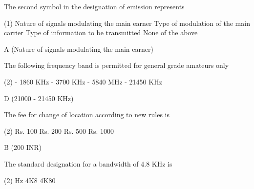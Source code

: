 \documentclass[a4paper]{article}
\begin{document}
\vspace{5mm}



\begin{question}The second symbol in the designation of emission represents
	\begin{tasks}(1)
		\task Nature of signals modulating the main earner
		\task Type of modulation of the main carrier
		\task Type of information to be transmitted
		\task None of the above
	\end{tasks}
\end{question}

\begin{solution}
	A (Nature of signals modulating the main earner)
\end{solution}

\vspace{5mm}



\begin{question}The following frequency band is permitted for general grade amateurs only
	\begin{tasks}(2)
		 - 1860 KHz
		 - 3700 KHz
		 - 5840 MHz
		 - 21450 KHz
	\end{tasks}
\end{question}

\begin{solution}
	D (21000 - 21450 KHz)
\end{solution}

\vspace{5mm}



\begin{question}The fee for change of location according to new rules is \spaces
	\begin{tasks}(2)
		\task Rs. 100
		\task Rs. 200
		\task Rs. 500
		\task Rs. 1000
	\end{tasks}
\end{question}

\begin{solution}
	B (200 INR)
\end{solution}

\vspace{5mm}



\begin{question}The standard designation for a bandwidth of 4.8 KHz is
	\begin{tasks}(2)
		 Hz
		\task 4K8
		\task 4K80
	\end{tasks}
\end{question}
\end{document}
